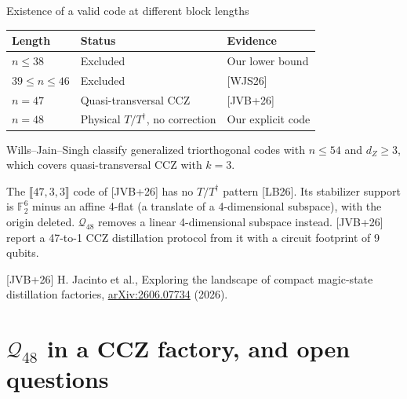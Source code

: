 \documentclass[aspectratio=169,11pt]{beamer}
\newcommand{\qcode}[3]{\llbracket #1,#2,#3\rrbracket}
\newcommand{\source}[1]{\par\vfill{\tiny\color{black!60}\setlength{\parskip}{1pt}#1\par}}
\newcommand{\refJ}{[JVB+26] H. Jacinto et al., Exploring the landscape of compact magic-state distillation factories, \href{https://arxiv.org/abs/2606.07734}{arXiv:2606.07734} (2026).}
\newcommand{\talktext}{\small\setlength{\parskip}{2.5pt}\setlength{\abovedisplayskip}{5pt}\setlength{\belowdisplayskip}{5pt}\setlength{\abovedisplayshortskip}{3pt}\setlength{\belowdisplayshortskip}{3pt}}
\newcommand{\F}{\mathbb F}
\begin{document}
\begin{frame}[label=landscape]{Existence of a valid code at different block lengths}
\talktext
\begin{center}\begin{tabular}{lll}\toprule
Length & Status & Evidence\\\midrule
$n\le38$ & Excluded & Our lower bound\\
$39\le n\le46$ & Excluded & [WJS26]\\
$n=47$ & Quasi-transversal CCZ & [JVB+26]\\
$n=48$ & Physical $T/T^\dagger$, no correction & Our explicit code\\\bottomrule
\end{tabular}\end{center}
Wills--Jain--Singh classify generalized triorthogonal codes with $n\le54$ and $d_Z\ge3$, which covers quasi-transversal CCZ with $k=3$.
\par
The $\qcode{47}{3}{3}$ code of [JVB+26] has no $T/T^\dagger$ pattern [LB26]. Its stabilizer support is $\F_2^6$ minus an affine 4-flat (a translate of a 4-dimensional subspace), with the origin deleted. $\mathcal Q_{48}$ removes a linear 4-dimensional subspace instead.
[JVB+26] report a 47-to-1 CCZ distillation protocol from it with a circuit footprint of 9 qubits.
\source{\refJ}
\end{frame}

\section{\texorpdfstring{$\mathcal Q_{48}$}{Q48} in a CCZ factory, and open questions}
\end{document}
